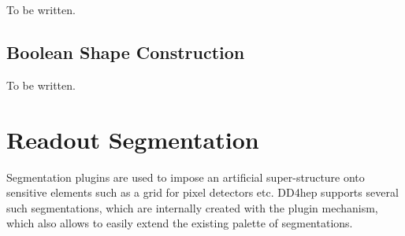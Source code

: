 To be written.

\subsection{Boolean Shape Construction}
\label{sec:dd4hep-manual-plugin-boolean-shape}

To be written.



\section{Readout Segmentation}
\label{sec:dd4hep-manual-segmentation-plugins}

Segmentation plugins are used to impose an artificial super-structure onto sensitive elements
such as a grid for pixel detectors etc. DD4hep supports several such segmentations, which 
are internally created with the plugin mechanism, which also allows to easily extend 
the existing palette of segmentations.

